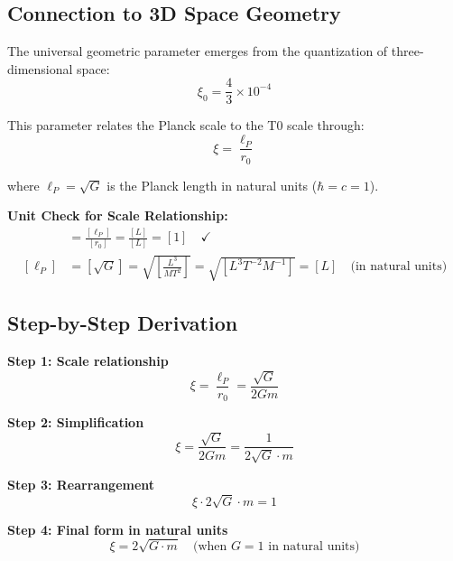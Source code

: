 \documentclass[12pt,a4paper]{article}
\theoremstyle{definition}
\begin{document}
	\subsection{Connection to 3D Space Geometry}
	
	The universal geometric parameter emerges from the quantization of three-dimensional space:
	\begin{equation}
		\xi_0 = \frac{4}{3} \times 10^{-4}
	\end{equation}
	
	This parameter relates the Planck scale to the T0 scale through:
	\begin{equation}
		\xi = \frac{\ell_P}{r_0}
	\end{equation}
	
	where $\ell_P = \sqrt{G}$ is the Planck length in natural units ($\hbar = c = 1$).
	
	{\footnotesize
		\textbf{Unit Check for Scale Relationship:}
		\begin{align}
			[\xi] &= \frac{[\ell_P]}{[r_0]} = \frac{[L]}{[L]} = [1] \quad \checkmark \\
			[\ell_P] &= [\sqrt{G}] = \sqrt{\left[\frac{L^3}{MT^2}\right]} = \sqrt{[L^3T^{-2}M^{-1}]} = [L] \quad \text{(in natural units)}
		\end{align}
	}
	
	\subsection{Step-by-Step Derivation}
	
	\textbf{Step 1: Scale relationship}
	\begin{equation}
		\xi = \frac{\ell_P}{r_0} = \frac{\sqrt{G}}{2Gm}
	\end{equation}
	
	\textbf{Step 2: Simplification}
	\begin{equation}
		\xi = \frac{\sqrt{G}}{2Gm} = \frac{1}{2\sqrt{G} \cdot m}
	\end{equation}
	
	\textbf{Step 3: Rearrangement}
	\begin{equation}
		\xi \cdot 2\sqrt{G} \cdot m = 1
	\end{equation}
	
	\textbf{Step 4: Final form in natural units}
	\begin{equation}
		\boxed{\xi = 2\sqrt{G \cdot m}} \quad \text{(when } G = 1 \text{ in natural units)}
	\end{equation}
	
\end{document}
